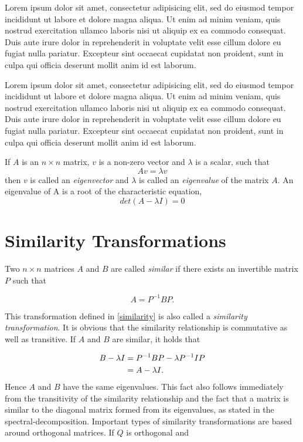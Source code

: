 \documentclass[12pt]{article}
\begin{document}
Lorem ipsum dolor sit amet, consectetur adipisicing elit, sed do eiusmod tempor incididunt ut labore et dolore magna aliqua. Ut enim ad minim veniam, quis nostrud exercitation ullamco laboris nisi ut aliquip ex ea commodo consequat. Duis aute irure dolor in reprehenderit in voluptate velit esse cillum dolore eu fugiat nulla pariatur. Excepteur sint occaecat cupidatat non proident, sunt in culpa qui officia deserunt mollit anim id est laborum.

Lorem ipsum dolor sit amet, consectetur adipisicing elit, sed do eiusmod tempor incididunt ut labore et dolore magna aliqua. Ut enim ad minim veniam, quis nostrud exercitation ullamco laboris nisi ut aliquip ex ea commodo consequat. Duis aute irure dolor in reprehenderit in voluptate velit esse cillum dolore eu fugiat nulla pariatur. Excepteur sint occaecat cupidatat non proident, sunt in culpa qui officia deserunt mollit anim id est laborum.

If $A$ is an $n \times n$ matrix, $v$ is a non-zero vector and $\lambda$ is a scalar, such that
\begin{equation}
\label{eigenvalue-def}
Av = \lambda v
\end{equation}
then $v$ is called an \textit{eigenvector} and $\lambda$ is called an \textit{eigenvalue} of the matrix $A$.
An eigenvalue of A is a root of the characteristic equation,
\begin{equation}
\label{eigenvalue-solve}
det\left(A - \lambda I \right) = 0
\end{equation}


\section{Similarity Transformations}

Two $n \times n$ matrices $A$ and $B$ are called \textit{similar} if there exists an invertible matrix $P$ such that

\begin{equation}
\label{similarity}
A = P^{-1} B P.
\end{equation}

This transformation defined in \ref{similarity} is also called a \textit{similarity transformation}. It is obvious that the similarity relationship is commutative as well as transitive. If $A$ and $B$ are similar, it holds that

\begin{align*}
B - \lambda I &= P^{-1} B P - \lambda P^{-1} I P \notag \\
              &= A - \lambda I.
\end{align*}
 Hence $A$ and $B$ have the same eigenvalues. This fact also follows immediately from the transitivity of the similarity relationship and the fact that a matrix is similar to the diagonal matrix formed from its eigenvalues, as stated in the spectral-decomposition. Important types of similarity transformations are based around orthogonal matrices. If $Q$ is orthogonal and
 
\end{document}
